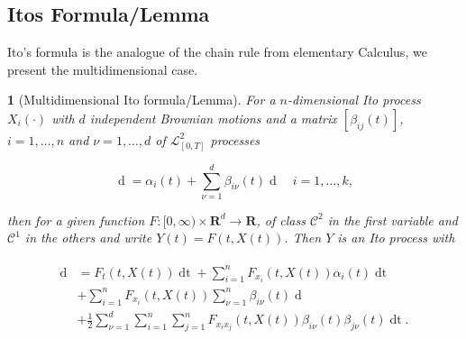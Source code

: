 \documentclass[british]{amsart} \usepackage{lmodern}
\numberwithin{equation}{section} \numberwithin{figure}{section}
\theoremstyle{plain} \newtheorem{thm}{\protect\theoremname}[section]
\theoremstyle{definition} \newtheorem{defn}[thm]{\protect\definitionname}
\theoremstyle{plain} \newtheorem{assumption}[thm]{\protect\assumptionname}
\theoremstyle{plain} \newtheorem{lem}[thm]{\protect\lemmaname}
\theoremstyle{plain} \newtheorem{prop}[thm]{\protect\propositionname}
\theoremstyle{remark} \newtheorem{rem}[thm]{\protect\remarkname}
\theoremstyle{plain} \newtheorem{cor}[thm]{\protect\corollaryname}
\renewcommand{\d}[1]{\mathop{\mathrm{d}{#1}}}
\begin{document}
\subsection{Itos Formula/Lemma}

Ito's formula is the analogue of the chain rule from elementary Calculus, we
present the multidimensional case.

\begin{thm} [Multidimensional Ito formula/Lemma]

  For a $n$-dimensional Ito process $X_{i}(\cdot)$ with $d$ independent Brownian motions and a
  matrix $[\beta_{ij}(t)]$, $i=1,\dots,n$ and $\nu=1,\dots,d$ of $\mathcal{L}_{[0,T]}^{2}$ processes

  \begin{equation}
    \d{X_{i}(t)} = \alpha_i(t) + \sum_{\nu=1}^d \beta_{i\nu}(t)\d{W_{\nu}(t)}
    \quad i=1,\dots,k,
  \end{equation}

  then for a given function $F:[0,\infty) \times \mathbf{R}^d \to \mathbf{R}$, of
  class $\mathcal{C}^2$ in the first variable and $\mathcal{C}^1$ in the others
  and write $Y(t)=F(t,X(t))$. Then $Y$ is an Ito process with

   \begin{gather}
    \begin{split}
    \d{Y(t)} &= F_{t}(t, X(t))\d{t} + \sum_{i=1}^n F_{x_{i}}(t,X(t)) \alpha_{i}(t)\d{t} \\
             & + \sum_{i=1}^n F_{x_{i}}(t,X(t)) \sum_{\nu=1}^n \beta_{i\nu}(t)\d{W_{\nu}(t)} \\
             & + \frac{1}{2} \sum_{\nu=1}^d \sum_{i=1}^n \sum_{j=1}^n
                  F_{x_{i}x_{j}}(t,X(t)) \beta_{i\nu}(t) \beta_{j\nu}(t)\d{t}.
    \end{split}
  \end{gather}
\end{thm}
\end{document}
